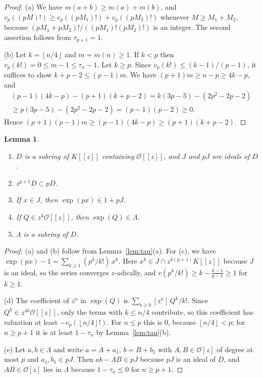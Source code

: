 \documentclass[11pt]{amsart}
\newtheorem{lemma}[theorem]{Lemma}
\theoremstyle{definition}
\theoremstyle{remark}
\newcommand{\cO}{\mathcal{O}}
\newcommand{\fl}[1]{\left\lfloor #1 \right\rfloor}
\begin{document}
\begin{proof}
(a) We have $m(a+b)\ge m(a)+m(b)$, and $v_p((pM)!)\ge v_p((pM_1)!)+v_p((pM_2)!)$ whenever
$M\ge M_1+M_2$, because $(pM_1+pM_2)!/((pM_1)!(pM_2)!)$ is an integer. The second assertion follows
from $\tau_{p+1}=1$.

(b) Let $k=\fl{n/4}$ and $m=m(n)\ge1$. If $k<p$ then $v_p(k!)=0\le m-1\le\tau_n-1$. Let $k\ge p$.
Since $v_p(k!)\le(k-1)/(p-1)$, it suffices to show $k+p-2\le(p-1)m$. We have
$(p+1)m\ge n-p\ge4k-p$, and
\begin{multline*}
(p-1)(4k-p)-(p+1)(k+p-2)=k(3p-5)-(2p^2-2p-2)\\
\ge p(3p-5)-(2p^2-2p-2)=(p-1)(p-2)\ge0 .
\end{multline*}
Hence $(p+1)(p-1)m\ge(p-1)(4k-p)\ge(p+1)(k+p-2)$.
\end{proof}

\begin{lemma}\label{lem:ring}
\begin{enumerate}
\item[(a)] $D$ is a subring of $K[[z]]$ containing $\cO[[z]]$, and $J$ and $pJ$ are ideals of $D$.
\item[(b)] $z^{p+1}D\subset pD$.
\item[(c)] If $x\in J$, then $\exp(px)\in1+pJ$.
\item[(d)] If $Q\in z^4\cO[[z]]$, then $\exp(Q)\in\Lambda$.
\item[(e)] $\Lambda$ is a subring of $D$.
\end{enumerate}
\end{lemma}

\begin{proof}
(a) and (b) follow from Lemma~\ref{lem:tau}(a). For (c), we have
$\exp(px)-1=\sum_{k\ge1}(p^k/k!)\,x^k$. Here $x^k\in J\cap z^{k(p+1)}K[[z]]$ because $J$ is an
ideal, so the series converges $z$-adically, and $v(p^k/k!)\ge k-\frac{k-1}{p-1}\ge1$ for $k\ge1$.

(d) The coefficient of $z^n$ in $\exp(Q)$ is $\sum_{k\ge0}[z^n]\,Q^k/k!$. Since
$Q^k\in z^{4k}\cO[[z]]$, only the terms with $k\le n/4$ contribute, so this coefficient has
valuation at least $-v_p(\fl{n/4}!)$. For $n\le p$ this is $0$, because $\fl{n/4}<p$; for
$n\ge p+1$ it is at least $1-\tau_n$ by Lemma~\ref{lem:tau}(b).

(e) Let $a,b\in\Lambda$ and write $a=A+a_1$, $b=B+b_1$ with $A,B\in\cO[z]$ of degree at most $p$
and $a_1,b_1\in pJ$. Then $ab-AB\in pJ$ because $pJ$ is an ideal of $D$, and $AB\in\cO[z]$ lies in
$\Lambda$ because $1-\tau_n\le0$ for $n\ge p+1$.
\end{proof}
\end{document}
